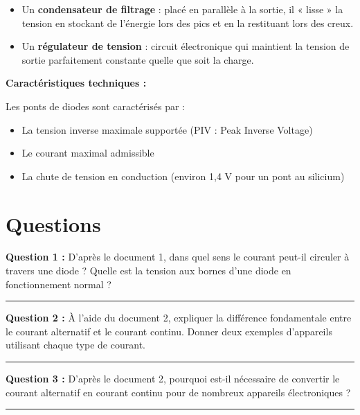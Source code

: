 \documentclass[11pt,a4paper]{article}
\begin{document}
\begin{itemize}
\item Un \textbf{condensateur de filtrage} : placé en parallèle à la sortie, il « lisse » la tension en stockant de l'énergie lors des pics et en la restituant lors des creux.
\item Un \textbf{régulateur de tension} : circuit électronique qui maintient la tension de sortie parfaitement constante quelle que soit la charge.
\end{itemize}

\vspace{0.3cm}
\textbf{Caractéristiques techniques :}

Les ponts de diodes sont caractérisés par :
\begin{itemize}
\item La tension inverse maximale supportée (PIV : Peak Inverse Voltage)
\item Le courant maximal admissible
\item La chute de tension en conduction (environ 1,4 V pour un pont au silicium)
\end{itemize}

\newpage

\section{Questions}

\textbf{Question 1 :} D'après le document 1, dans quel sens le courant peut-il circuler à travers une diode ? Quelle est la tension aux bornes d'une diode en fonctionnement normal ?

\vspace{2cm}
\hrule
\vspace{2cm}

\textbf{Question 2 :} À l'aide du document 2, expliquer la différence fondamentale entre le courant alternatif et le courant continu. Donner deux exemples d'appareils utilisant chaque type de courant.

\vspace{3cm}
\hrule
\vspace{2cm}

\textbf{Question 3 :} D'après le document 2, pourquoi est-il nécessaire de convertir le courant alternatif en courant continu pour de nombreux appareils électroniques ?

\vspace{2cm}
\hrule
\vspace{2cm}
\end{document}
